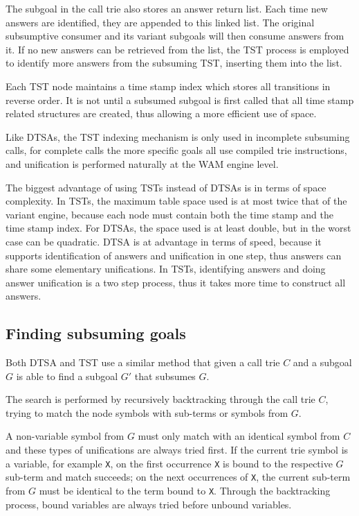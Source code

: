 The subgoal in the call trie also stores an answer return list. Each time new answers are identified, they are appended
to this linked list. The original subsumptive consumer and its variant subgoals will then consume answers from it. If no
new answers can be retrieved from the list, the TST process is employed to identify more answers from the subsuming TST,
inserting them into the list.

Each TST node maintains a time stamp index which stores all transitions in reverse order.
It is not until a subsumed subgoal is first called that all time stamp related structures are created, thus
allowing a more efficient use of space.

Like DTSAs, the TST indexing mechanism is only used in incomplete subsuming calls, for complete calls
the more specific goals all use compiled trie instructions, and unification is performed naturally at
the WAM engine level.

The biggest advantage of using TSTs instead of DTSAs is in terms of space complexity. In TSTs, the maximum table space
used is at most twice that of the variant engine, because each node must contain both the time stamp and the time stamp index.
For DTSAs, the space used is at least double, but in the worst
case can be quadratic. DTSA is at advantage in terms of speed, because it supports identification of answers and
unification in one step, thus answers can share some elementary unifications. In TSTs, identifying answers
and doing answer unification is a two step process, thus it takes more time to construct all answers. 

\subsection{Finding subsuming goals}

Both DTSA and TST use a similar method that given a call trie $C$ and a subgoal $G$
is able to find a subgoal $G'$ that subsumes $G$.

The search is performed by recursively backtracking through the call trie $C$, trying
to match the node symbols with sub-terms or symbols from $G$.

A non-variable symbol from $G$ must only match with an identical symbol from $C$ and
these types of unifications are always tried first.
If the current trie symbol is a variable, for example \texttt{X}, on the first occurrence \texttt{X}
is bound to the respective $G$ sub-term
and match succeeds; on the next occurrences of \texttt{X}, the current sub-term from $G$ must
be identical to the term bound to \texttt{X}. Through the backtracking process, bound variables are
always tried before unbound variables.

